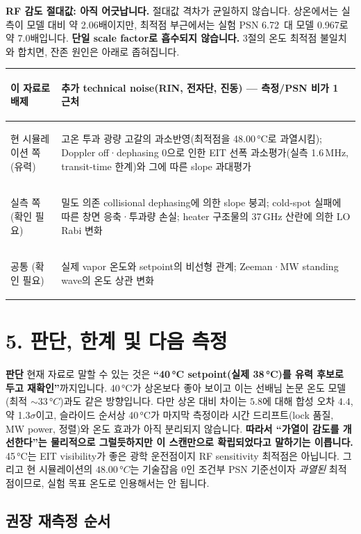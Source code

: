 \documentclass[10pt,a4paper]{article}
\newcommand{\summarybox}[1]{%
  \noindent\colorbox{pale}{%
    \parbox{\dimexpr\textwidth-2\fboxsep\relax}{#1}}}
\providecommand{\SensitivityOptimumTemperatureC}{48.00}
\providecommand{\TotalSensitivityOptimum}{0.967}
\providecommand{\ModelToPPTScaleRoom}{2.06}
\providecommand{\PPTBestPSNLimit}{6.72}
\providecommand{\ModelToPPTScaleOptimum}{7.0}
\providecommand{\PaperPSNOptimumC}{33}
\providecommand{\EITLinewidthMHz}{1.6}
\begin{document}
\textbf{RF 감도 절대값: 아직 어긋납니다.} 절대값 격차가 균일하지 않습니다. 상온에서는 실측이 모델
대비 약 \ModelToPPTScaleRoom 배이지만, 최적점 부근에서는 실험 PSN \PPTBestPSNLimit\ 대 모델
\TotalSensitivityOptimum 로 약 \ModelToPPTScaleOptimum 배입니다. \textbf{단일 scale factor로
흡수되지 않습니다.} 3절의 온도 최적점 불일치와 합치면, 잔존 원인은 아래로 좁혀집니다.

\begin{tabularx}{\textwidth}{>{\bfseries\raggedright\arraybackslash}p{4.0cm}X}
\toprule
이 자료로 배제 & 추가 technical noise(RIN, 전자단, 진동) --- 측정/PSN 비가 1 근처\\
\midrule
현 시뮬레이션 쪽 (유력) & 고온 투과 광량 고갈의 과소반영(최적점을 \SensitivityOptimumTemperatureC\,°C로
  과열시킴); Doppler off·dephasing 0으로 인한 EIT 선폭 과소평가(실측 \EITLinewidthMHz\,MHz,
  transit-time 한계)와 그에 따른 slope 과대평가\\
실측 쪽 (확인 필요) & 밀도 의존 collisional dephasing에 의한 slope 붕괴; cold-spot 실패에 따른
  창면 응축·투과량 손실; heater 구조물의 37\,GHz 산란에 의한 LO Rabi 변화\\
공통 (확인 필요) & 실제 vapor 온도와 setpoint의 비선형 관계; Zeeman·MW standing wave의 온도 상관 변화\\
\bottomrule
\end{tabularx}

\section*{5. 판단, 한계 및 다음 측정}

\summarybox{%
\textbf{\color{navy}판단}\quad
현재 자료로 말할 수 있는 것은 \textbf{``40\,°C setpoint(실제 38\,°C)를 유력 후보로 두고 재확인''}까지입니다.
40\,°C가 상온보다 좋아 보이고 이는 선배님 논문 온도 모델(최적 \(\sim\PaperPSNOptimumC\,°C\))과도
같은 방향입니다. 다만 상온 대비 차이는 \(5.8\)에 대해 합성 오차 \(4.4\), 약 1.3$\sigma$이고,
슬라이드 순서상 40\,°C가 마지막 측정이라 시간 드리프트(lock 품질, MW power, 정렬)와 온도 효과가
아직 분리되지 않습니다. \textbf{따라서 ``가열이 감도를 개선한다''는 물리적으로 그럴듯하지만 이
스캔만으로 확립되었다고 말하기는 이릅니다.} 45\,°C는 EIT visibility가 좋은 광학 운전점이지 RF
sensitivity 최적점은 아닙니다. 그리고 현 시뮬레이션의 \(\SensitivityOptimumTemperatureC\,°C\)는
기술잡음 0인 조건부 PSN 기준선이자 \emph{과열된} 최적점이므로, 실험 목표 온도로 인용해서는 안 됩니다.}

\subsection*{권장 재측정 순서}
\end{document}
